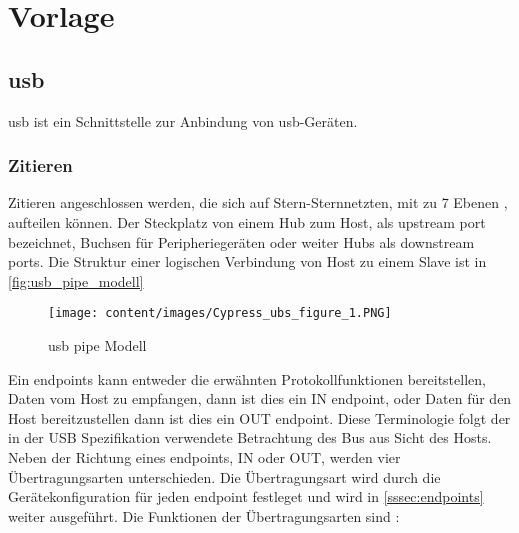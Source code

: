 \section{Vorlage}
\subsection[USB]{\acrshort{usb}}
\acrfull{usb} ist ein Schnittstelle zur Anbindung von \acrshort{usb}-Geräten.


\subsubsection{Zitieren} \label{sssec:zitieren}

Zitieren \cite[s. 31]{usb_developer_guide} angeschlossen werden, die sich auf Stern-Sternnetzten, mit zu 7 Ebenen \cite[4.1.1]{usb_developer_guide}, aufteilen können. Der Steckplatz von einem Hub zum Host, als upstream port bezeichnet, Buchsen für Peripheriegeräten oder weiter Hubs als downstream ports.
Die Struktur einer logischen Verbindung von Host zu einem Slave ist in \autoref{fig:usb_pipe_modell} 
\begin{figure}[h]
    \centering
    \texttt{[image: content/images/Cypress\_ubs\_figure\_1.PNG]}
    \caption{\acrshort{usb} pipe Modell \cite[Figure~1]{usb_developer_guide}}
    \label{fig:usb_pipe_modell}
\end{figure}
\par
Ein endpoints kann entweder die erwähnten Protokollfunktionen bereitstellen, Daten vom Host zu empfangen, dann ist dies ein IN endpoint, oder Daten für den Host bereitzustellen dann ist dies ein OUT endpoint. Diese Terminologie folgt der in der USB Spezifikation verwendete Betrachtung des Bus aus Sicht des Hosts.
Neben der Richtung eines endpoints, IN oder OUT, werden vier Übertragungsarten \cite[5.4]{usb_developer_guide} unterschieden. Die Übertragungsart wird durch die Gerätekonfiguration für jeden endpoint festleget und wird in \autoref{sssec:endpoints} weiter ausgeführt. Die Funktionen der Übertragungsarten sind \cite[4.7]{usb_developer_guide}:


